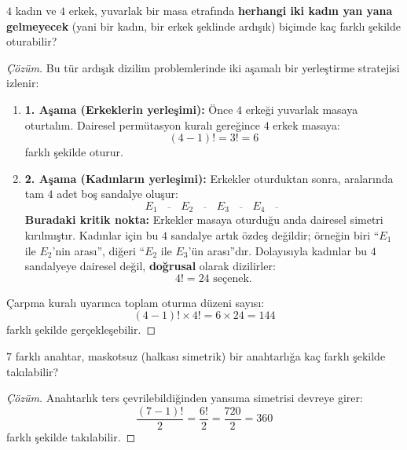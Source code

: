 \begin{example}
$4$ kadın ve $4$ erkek, yuvarlak bir masa etrafında \textbf{herhangi iki kadın yan yana gelmeyecek} (yani bir kadın, bir erkek şeklinde ardışık) biçimde kaç farklı şekilde oturabilir?
\end{example}
\begin{proof}[Çözüm]
Bu tür ardışık dizilim problemlerinde iki aşamalı bir yerleştirme stratejisi izlenir:
\begin{enumerate}
  \item \textbf{1. Aşama (Erkeklerin yerleşimi):} Önce $4$ erkeği yuvarlak masaya oturtalım. Dairesel permütasyon kuralı gereğince $4$ erkek masaya:
  \[ (4 - 1)! = 3! = 6 \]
  farklı şekilde oturur.
  
  \item \textbf{2. Aşama (Kadınların yerleşimi):} Erkekler oturduktan sonra, aralarında tam $4$ adet boş sandalye oluşur:
  \[ E_1 \;\; \overline{\quad} \;\; E_2 \;\; \overline{\quad} \;\; E_3 \;\; \overline{\quad} \;\; E_4 \;\; \overline{\quad} \]
  \textbf{Buradaki kritik nokta:} Erkekler masaya oturduğu anda dairesel simetri kırılmıştır. Kadınlar için bu $4$ sandalye artık özdeş değildir; örneğin biri ``$E_1$ ile $E_2$'nin arası'', diğeri ``$E_2$ ile $E_3$'ün arası''dır. Dolayısıyla kadınlar bu $4$ sandalyeye dairesel değil, \textbf{doğrusal} olarak dizilirler:
  \[ 4! = 24 \text{ seçenek.} \]
\end{enumerate}
Çarpma kuralı uyarınca toplam oturma düzeni sayısı:
\[ (4 - 1)! \times 4! = 6 \times 24 = 144 \]
farklı şekilde gerçekleşebilir.
\end{proof}

\begin{example}
$7$ farklı anahtar, maskotsuz (halkası simetrik) bir anahtarlığa kaç farklı şekilde takılabilir?
\end{example}
\begin{proof}[Çözüm]
Anahtarlık ters çevrilebildiğinden yansıma simetrisi devreye girer:
\[ \frac{(7 - 1)!}{2} = \frac{6!}{2} = \frac{720}{2} = 360 \]
farklı şekilde takılabilir.
\end{proof}
